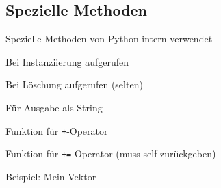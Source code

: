 \subsection{Spezielle Methoden}
\begin{frame}{Spezielle Methoden}
	von Python intern verwendet

	\begin{description}
        \item<1->[\tt\_\_init\_\_] Bei Instanziierung aufgerufen
		\item<2->[\tt\_\_del\_\_] Bei Löschung aufgerufen (selten)
        \item<3->[\tt\_\_str\_\_] Für Ausgabe als String
        \item<4->[\tt\_\_add\_\_] Funktion für \alert{\tt +}-Operator
        \item<5->[\tt\_\_iadd\_\_] Funktion für \alert{\tt +=}-Operator (muss self zurückgeben)
	\end{description}
\end{frame}
\begin{frame}{Beispiel: Mein Vektor}
    
\end{frame}



